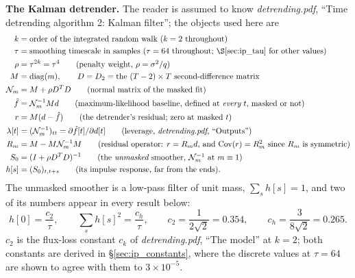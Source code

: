 \documentclass{article}
\numberwithin{equation}{section}   %
\def\nn{\nonumber}
\newcommand{\dtnotes}[1]{{\em detrending.pdf}, ``#1''}
\begin{document}
{\bf The Kalman detrender.}  The reader is assumed to know \dtnotes{Time detrending algorithm 2: Kalman
filter}; the objects used here are
\begin{align}
k &= \mbox{order of the integrated random walk ($k=2$ throughout)} \nn \\
\tau &= \mbox{smoothing timescale in samples ($\tau = 64$ throughout; \S\ref{sec:ip_tau} for other values)} \nn \\
\rho &= \tau^{2k} = \tau^4 \qquad \mbox{(penalty weight, $\rho = \sigma^2/q$)} \nn \\
M &= {\rm diag}(m), \qquad D = D_2 = \mbox{the $(T-2) \times T$ second-difference matrix} \nn \\
{\cal N}_m &= M + \rho D^TD \qquad \mbox{(normal matrix of the masked fit)} \nn \\
\hat f &= {\cal N}_m^{-1} M d \qquad \mbox{(maximum-likelihood baseline, defined at {\em every} $t$, masked or not)} \nn \\
r &= M(d - \hat f) \qquad \mbox{(the detrender's residual; zero at masked $t$)} \nn \\
\lambda[t] &= ({\cal N}_m^{-1})_{tt} = \partial \hat f[t]/\partial d[t] \qquad \mbox{(leverage, \dtnotes{Outputs})} \nn \\
R_m &= M - M {\cal N}_m^{-1} M \qquad \mbox{(residual operator: $r = R_m d$, and ${\rm Cov}(r) = R_m^2$ since $R_m$ is symmetric)} \nn \\
S_0 &= (I + \rho D^TD)^{-1} \qquad \mbox{(the {\em unmasked} smoother, ${\cal N}_m^{-1}$ at $m \equiv 1$)} \nn \\
h[s] &= (S_0)_{t,t+s} \qquad \mbox{(its impulse response, far from the ends)} .
\label{eq:ip_notation}
\end{align}
The unmasked smoother is a low-pass filter of unit mass, $\sum_s h[s] = 1$, and two of its numbers appear
in every result below:
\begin{equation}
h[0] = \frac{c_2}{\tau}, \qquad
\sum_s h[s]^2 = \frac{c_h}{\tau}, \qquad
c_2 = \frac{1}{2\sqrt2} = 0.354, \qquad
c_h = \frac{3}{8\sqrt2} = 0.265 .
\label{eq:ip_constants}
\end{equation}
$c_2$ is the flux-loss constant $c_k$ of \dtnotes{The model} at $k = 2$; both constants are derived in
\S\ref{sec:ip_constants}, where the discrete values at $\tau = 64$ are shown to agree with them to
$3 \times 10^{-5}$.
\end{document}
